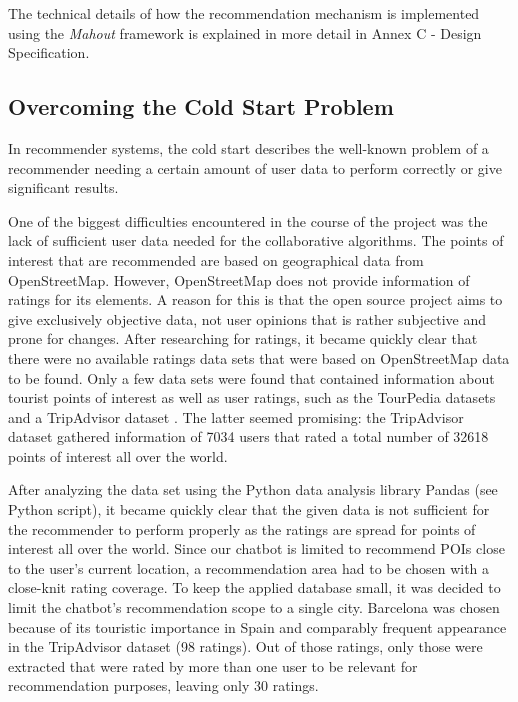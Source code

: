 The technical details of how the recommendation mechanism is implemented using the \textit{Mahout} framework is explained in more detail in Annex C - Design Specification.

\subsection{Overcoming the Cold Start Problem}
In recommender systems, the cold start describes the well-known problem of a recommender needing a certain amount of user data to perform correctly or give significant results. 

One of the biggest difficulties encountered in the course of the project was the lack of sufficient user data needed for the collaborative algorithms. The points of interest that are recommended are based on geographical data from OpenStreetMap. However, OpenStreetMap does not provide information of ratings for its elements. A reason for this is that the open source project aims to give exclusively objective data, not user opinions that is rather subjective and prone for changes. After researching for ratings, it became quickly clear that there were no available ratings data sets that were based on OpenStreetMap data to be found. Only a few data sets were found that contained information about tourist points of interest as well as user ratings, such as the TourPedia datasets \cite{tourpedia} and a TripAdvisor dataset \cite{roshchina15}. The latter seemed promising: the TripAdvisor dataset gathered information of 7034 users that rated a total number of 32618 points of interest all over the world.

After analyzing the data set using the Python data analysis library Pandas (see Python script), it became quickly clear that the given data is not sufficient for the recommender to perform properly as the ratings are spread for points of interest all over the world. Since our chatbot is limited to recommend POIs close to the user’s current location, a recommendation area had to be chosen with a close-knit rating coverage. To keep the applied database small, it was decided to limit the chatbot’s recommendation scope to a single city. Barcelona was chosen because of its touristic importance in Spain and comparably frequent appearance in the TripAdvisor dataset (98 ratings). Out of those ratings, only those were extracted that were rated by more than one user to be relevant for recommendation purposes, leaving only 30 ratings.

